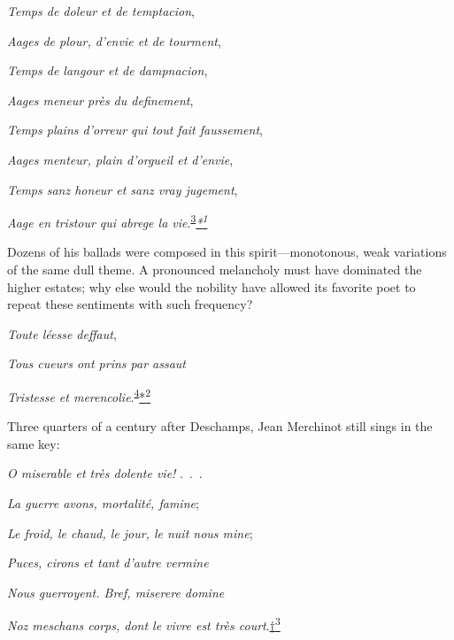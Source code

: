 \emph{Temps de doleur et de temptacion},

\emph{Aages de plour, d'envie et de tourment},

\emph{Temps de langour et de dampnacion},

\emph{Aages meneur près du definement},

\emph{Temps plains d'orreur qui tout fait faussement},

\emph{Aages menteur, plain d'orgueil et d'envie},

\emph{Temps sanz honeur et sanz vray jugement},

\emph{Aage en tristour qui abrege la
vie}.\textsuperscript{\protect\hypertarget{09_Chapter_Two__THE_CRAVING_FOR_A_M.xhtmlux5cux23id_2080}{\protect\hyperlink{23_NOTES.xhtmlux5cux23id_2081}{3}}}\emph{\protect\hypertarget{09_Chapter_Two__THE_CRAVING_FOR_A_M.xhtmlux5cux23id_2411}{\protect\hyperlink{23_NOTES.xhtmlux5cux23id_2412}{*\textsuperscript{1}}}}

Dozens of his ballads were composed in this spirit---monotonous, weak
variations of the same dull theme. A pronounced melancholy must have
dominated the higher estates; why else would
\protect\hypertarget{09_Chapter_Two__THE_CRAVING_FOR_A_M.xhtmlux5cux23page_33}{}{}the
nobility have allowed its favorite poet to repeat these sentiments with
such frequency?

\emph{Toute léesse deffaut},

\emph{Tous cueurs ont prins par assaut}

\emph{Tristesse et
merencolie}.\textsuperscript{\protect\hypertarget{09_Chapter_Two__THE_CRAVING_FOR_A_M.xhtmlux5cux23id_2078}{\protect\hyperlink{23_NOTES.xhtmlux5cux23id_2079}{4}}}\protect\hypertarget{09_Chapter_Two__THE_CRAVING_FOR_A_M.xhtmlux5cux23id_2413}{\protect\hyperlink{23_NOTES.xhtmlux5cux23id_2414}{*\textsuperscript{2}}}

Three quarters of a century after Deschamps, Jean Merchinot still sings
in the same key:

\emph{O miserable et très dolente vie!} .~.~.

\emph{La guerre avons, mortalité, famine};

\emph{Le froid, le chaud, le jour, le nuit nous mine};

\emph{Puces, cirons et tant d'autre vermine}

\emph{Nous guerroyent. Bref, miserere domine}

\emph{Noz meschans corps, dont le vivre est très
court}.\protect\hypertarget{09_Chapter_Two__THE_CRAVING_FOR_A_M.xhtmlux5cux23id_2415}{\protect\hyperlink{23_NOTES.xhtmlux5cux23id_2416}{†\textsuperscript{3}}}

